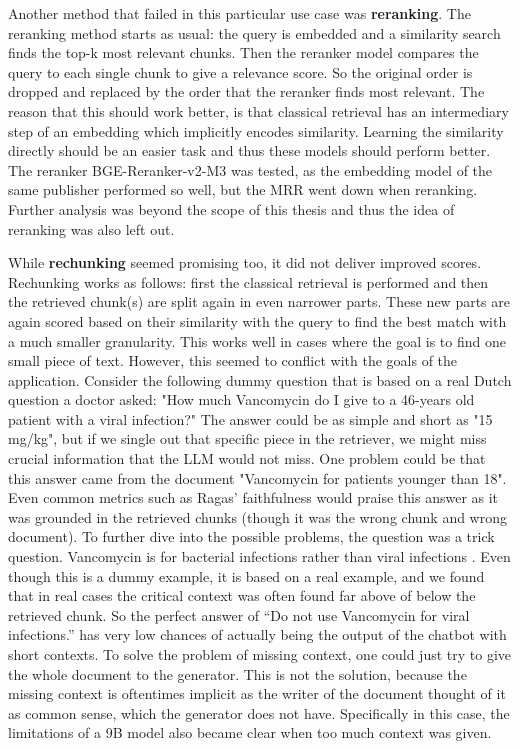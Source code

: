 Another method that failed in this particular use case was \textbf{reranking}. The reranking method starts as usual: the query is embedded and a similarity search finds the top-k most relevant chunks. Then the reranker model compares the query to each single chunk to give a relevance score. So the original order is dropped and replaced by the order that the reranker finds most relevant. The reason that this should work better, is that classical retrieval has an intermediary step of an embedding which implicitly encodes similarity. Learning the similarity directly should be an easier task and thus these models should perform better. The reranker BGE-Reranker-v2-M3 \cite{chen2024bge} was tested, as the embedding model of the same publisher performed so well, but the MRR went down when reranking. Further analysis was beyond the scope of this thesis and thus the idea of reranking was also left out.

While \textbf{rechunking} seemed promising too, it did not deliver improved scores. Rechunking works as follows: first the classical retrieval is performed and then the retrieved chunk(s) are split again in even narrower parts. These new parts are again scored based on their similarity with the query to find the best match with a much smaller granularity. This works well in cases where the goal is to find one small piece of text. However, this seemed to conflict with the goals of the application. Consider the following dummy question that is based on a real Dutch question a doctor asked: "How much Vancomycin do I give to a 46-years old patient with a viral infection?" The answer could be as simple and short as "15 mg/kg", but if we single out that specific piece in the retriever, we might miss crucial information that the LLM would not miss. One problem could be that this answer came from the document "Vancomycin for patients younger than 18". Even common metrics such as Ragas' \cite{es2024ragas} faithfulness would praise this answer as it was grounded in the retrieved chunks (though it was the wrong chunk and wrong document). To further dive into the possible problems, the question was a trick question. Vancomycin is for bacterial infections rather than viral infections \cite{vancomycin_wikipedia}. Even though this is a dummy example, it is based on a real example, and we found that in real cases the critical context was often found far above of below the retrieved chunk. So the perfect answer of ``Do not use Vancomycin for viral infections.'' has very low chances of actually being the output of the chatbot with short contexts. To solve the problem of missing context, one could just try to give the whole document to the generator. This is not the solution, because the missing context is oftentimes implicit as the writer of the document thought of it as common sense, which the generator does not have. Specifically in this case, the limitations of a 9B model also became clear when too much context was given.

